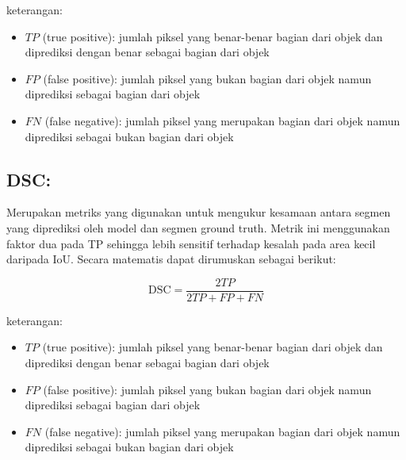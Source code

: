 \noindent
keterangan:
\begin{itemize}
	\item $TP$ (true positive): jumlah piksel yang benar-benar bagian dari objek dan diprediksi dengan benar sebagai bagian dari objek
	\item $FP$ (false positive): jumlah piksel yang bukan bagian dari objek namun diprediksi sebagai bagian dari objek
	\item $FN$ (false negative): jumlah piksel yang merupakan bagian dari objek namun diprediksi sebagai bukan bagian dari objek
\end{itemize}

\subsection{DSC:}

\noindent Merupakan metriks yang digunakan untuk mengukur kesamaan antara segmen yang diprediksi oleh model dan segmen ground truth\cite{jiang_iu-net_2023}. Metrik ini menggunakan faktor dua pada TP sehingga lebih sensitif terhadap kesalah pada area kecil daripada IoU. Secara matematis dapat dirumuskan sebagai berikut:

\begin{equation}
	\text{DSC} =  \frac{2TP}{2TP + FP + FN}
\end{equation}

\noindent
keterangan:
\begin{itemize}
	\item $TP$ (true positive): jumlah piksel yang benar-benar bagian dari objek dan diprediksi dengan benar sebagai bagian dari objek
	\item $FP$ (false positive): jumlah piksel yang bukan bagian dari objek namun diprediksi sebagai bagian dari objek
	\item $FN$ (false negative): jumlah piksel yang merupakan bagian dari objek namun diprediksi sebagai bukan bagian dari objek
\end{itemize}


